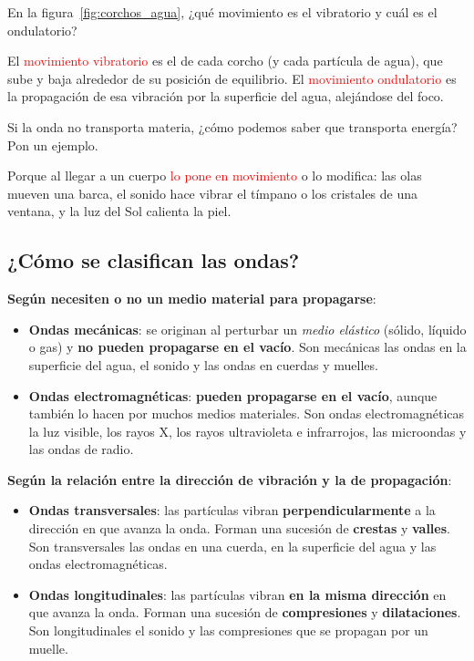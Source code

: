 \begin{exercise}
    En la figura~\ref{fig:corchos_agua}, ¿qué movimiento es el vibratorio y cuál es el ondulatorio?
    \begin{solu}
        El \textcolor{red}{movimiento vibratorio} es el de cada corcho (y cada partícula de agua), que sube y baja alrededor de su posición de equilibrio. El \textcolor{red}{movimiento ondulatorio} es la propagación de esa vibración por la superficie del agua, alejándose del foco.
    \end{solu}
\end{exercise}

\begin{exercise}
    Si la onda no transporta materia, ¿cómo podemos saber que transporta energía? Pon un ejemplo.
    \begin{solu}
        Porque al llegar a un cuerpo \textcolor{red}{lo pone en movimiento} o lo modifica: las olas mueven una barca, el sonido hace vibrar el tímpano o los cristales de una ventana, y la luz del Sol calienta la piel.
    \end{solu}
\end{exercise}

\subsection{¿Cómo se clasifican las ondas?}

\textbf{Según necesiten o no un medio material para propagarse}:
\begin{itemize}
    \item \textbf{Ondas mecánicas}: se originan al perturbar un \emph{medio elástico} (sólido, líquido o gas) y \textbf{no pueden propagarse en el vacío}. Son mecánicas las ondas en la superficie del agua, el sonido y las ondas en cuerdas y muelles.
    \item \textbf{Ondas electromagnéticas}: \textbf{pueden propagarse en el vacío}, aunque también lo hacen por muchos medios materiales. Son ondas electromagnéticas la luz visible, los rayos X, los rayos ultravioleta e infrarrojos, las microondas y las ondas de radio.
\end{itemize}

\textbf{Según la relación entre la dirección de vibración y la de propagación}:
\begin{itemize}
    \item \textbf{Ondas transversales}: las partículas vibran \textbf{perpendicularmente} a la dirección en que avanza la onda. Forman una sucesión de \textbf{crestas} y \textbf{valles}. Son transversales las ondas en una cuerda, en la superficie del agua y las ondas electromagnéticas.
    \item \textbf{Ondas longitudinales}: las partículas vibran \textbf{en la misma dirección} en que avanza la onda. Forman una sucesión de \textbf{compresiones} y \textbf{dilataciones}. Son longitudinales el sonido y las compresiones que se propagan por un muelle.
\end{itemize}

